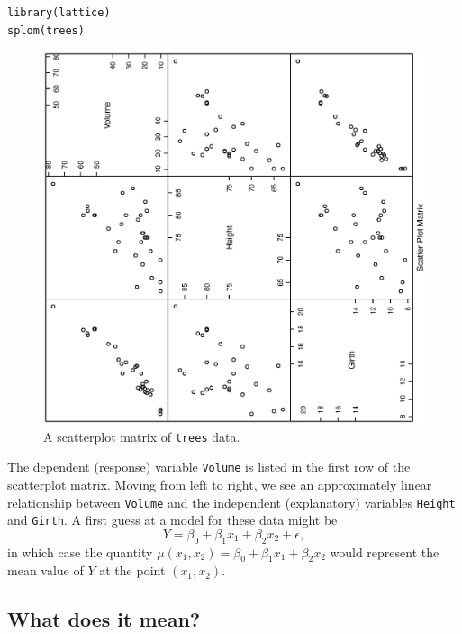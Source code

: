 \documentclass[captions=tableheading]{scrbook}
\begin{document}
\begin{example}
\lstset{language=R}
\begin{lstlisting}
library(lattice)
splom(trees)
\end{lstlisting}





\begin{figure}[th]
  \includegraphics[angle=270, totalheight=4in]{ps/mlr/splom-trees.ps}
  \caption[Scatterplot matrix of \texttt{trees} data]{\small A scatterplot matrix of \texttt{trees} data.}
  \label{fig-splom-trees}
\end{figure}


The dependent (response) variable \texttt{Volume} is listed in the first row of the scatterplot matrix. Moving from left to right, we see an approximately linear relationship between \texttt{Volume} and the independent (explanatory) variables \texttt{Height} and \texttt{Girth}. A first guess at a model for these data might be
\begin{equation}
Y=\beta_{0}+\beta_{1}x_{1}+\beta_{2}x_{2}+\epsilon,
\end{equation}
in which case the quantity \(\mu(x_{1},x_{2})=\beta_{0}+\beta_{1}x_{1}+\beta_{2}x_{2}\) would represent the mean value of \(Y\) at the point \((x_{1},x_{2})\).
\end{example}
\subsection{What does it mean?}
\label{sec-12-1-1}
\end{document}
